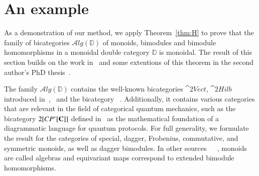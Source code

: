 \section{An example}\label{sec:Alg} 
As a demonstration of our method, we apply Theorem~\ref{thm:H} to prove that the family of bicategories $\mathcal{A}lg({\mathbb{D}})$ of monoids, bimodules and bimodule homomorphisms in a monoidal double category $\mathbb{D}$ is monoidal. The result of this section builds on the work in~\cite[Theorem 11.5]{shulman:frbi} and some extentions of this theorem in the second author's PhD thesis~\cite[Chapter 5]{westerthesis}.

The family $\mathcal{A}lg({\mathbb{D}})$ contains the well-known bicategories $\cat{2Vect}$, $\cat{2Hilb}$  introduced in~\cite{kapranov562},~\cite{baez2004higher} and the bicategory ~\cite{?}. Additionally, it contains various categories that are relevant in the field of categorical quantum mechanics, such as the bicategory $2[CP^*[{\bf C}]]$ defined in~\cite{heunenvicarywester} as the mathematical foundation of a diagrammatic language for quantum protocols. For full generality, we formulate the result for the categories of special, dagger, Frobenius, commutative, and symmetric monoids, as well as dagger bimodules.
In other sources~\cite{westerthesis}~\cite{jamiesbook}~\cite{heunenvicarywester},  monoids are called algebras and equivariant maps correspond to extended bimodule homomorphisms. 


